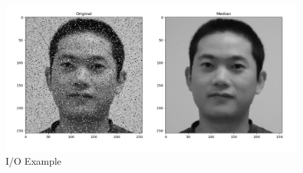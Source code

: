 \begin{figure}[H]
	\centering
	\includegraphics[width=\linewidth]{images/salt_pepper.jpg}
	\caption{I/O Example}
\end{figure}

